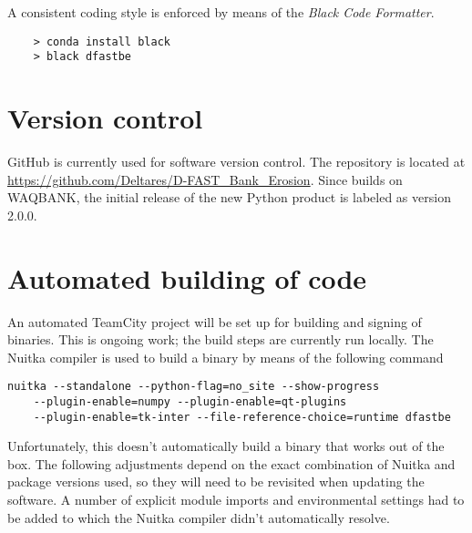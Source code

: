 A consistent coding style is enforced by means of the \emph{Black Code Formatter}.

\begin{Verbatim}
    > conda install black
    > black dfastbe
\end{Verbatim}

\section{Version control}

GitHub is currently used for software version control.
The repository is located at \url{https://github.com/Deltares/D-FAST_Bank_Erosion}.
Since \dfastbe builds on WAQBANK, the initial release of the new Python product is labeled as version 2.0.0.

\section{Automated building of code}

An automated TeamCity project will be set up for building and signing of binaries.
This is ongoing work; the build steps are currently run locally.
The Nuitka compiler is used to build a binary by means of the following command

\begin{Verbatim}
nuitka --standalone --python-flag=no_site --show-progress
    --plugin-enable=numpy --plugin-enable=qt-plugins
    --plugin-enable=tk-inter --file-reference-choice=runtime dfastbe
\end{Verbatim}

Unfortunately, this doesn't automatically build a binary that works out of the box.
The following adjustments depend on the exact combination of Nuitka and package versions used, so they will need to be revisited when updating the software.
A number of explicit module imports and environmental settings had to be added to  which the Nuitka compiler didn't automatically resolve.

